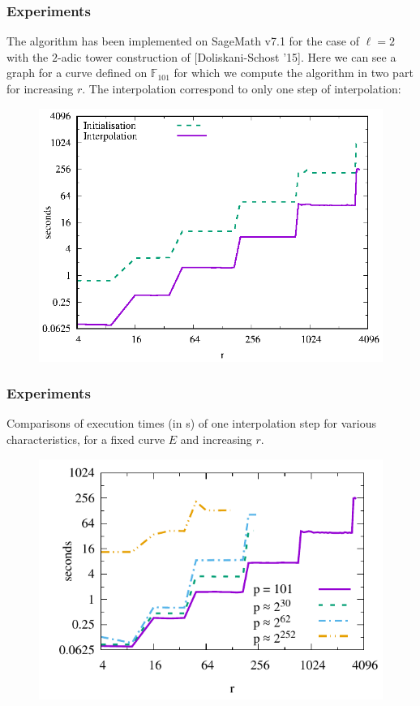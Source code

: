 \documentclass[10pt,a4paper]{beamer}
\theoremstyle{plain}
\theoremstyle{definition}
\theoremstyle{definition}
\theoremstyle{definition}
\theoremstyle{definition}
\theoremstyle{remark}
\theoremstyle{remark}
\begin{document}
\begin{frame}
\frametitle{Experiments}
The algorithm has been implemented on SageMath v7.1 for the case of $\ell=2$ with the $2$-adic tower construction of [Doliskani-Schost '15].%
Here we can see a graph for a curve defined on $\mathbb{F}_{101}$ for which we compute the algorithm in two part for increasing $r$. The interpolation correspond to only one step of interpolation:
\begin{figure}[hbtp]
\centering
\includegraphics[scale=0.7]{Images/graphe-101-bis.eps}
\end{figure}
\end{frame}


\begin{frame}
\frametitle{Experiments}
Comparisons of execution times (in s) of one interpolation step for various characteristics, for a fixed curve $E$ and increasing $r$.
\begin{figure}[hbtp]
\centering
\includegraphics[scale=0.8]{Images/graphe-101-149-269.pdf}
\end{figure}
\end{frame}
\end{document}
